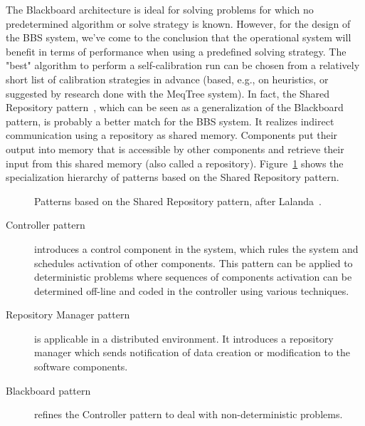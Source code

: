 \documentclass[10pt]{lofar}
\begin{document}
The Blackboard architecture is ideal for solving problems for which no
predetermined algorithm or solve strategy is known. However, for the design of
the BBS system, we've come to the conclusion that the operational system will
benefit in terms of performance when using a predefined solving strategy. The
"best" algorithm to perform a self-calibration run can be chosen from a
relatively short list of calibration strategies in advance (based, e.g., on
heuristics, or suggested by research done with the MeqTree system).  In fact,
the Shared Repository pattern~\cite{Lalanda1998}, which can be seen as a
generalization of the Blackboard pattern, is probably a better match for the
BBS system. It realizes indirect communication using a repository as shared
memory. Components put their output into memory that is accessible by other
components and retrieve their input from this shared memory (also called a
repository). Figure~\ref{fig:shared-repository-pattern} shows the
specialization hierarchy of patterns based on the Shared Repository pattern.

\begin{figure}[!ht]
\centering
{}
\caption{Patterns based on the Shared Repository pattern, after
Lalanda~\cite{Lalanda1998}.}
\label{fig:shared-repository-pattern}
\end{figure}

\begin{description}
\item [Controller pattern] introduces a control component in the system, which
rules the system and schedules activation of other components. This pattern
can be applied to deterministic problems where sequences of components
activation can be determined off-line and coded in the controller using
various techniques.
\item[Repository Manager pattern] is applicable in a distributed
environment. It introduces a repository manager which sends notification of
data creation or modification to the software components.
\item[Blackboard pattern] refines the Controller pattern to deal with
non-deterministic problems.
\end{description}
\end{document}
